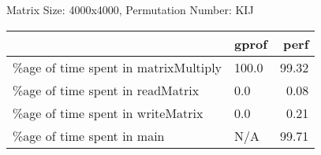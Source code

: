 \documentclass{article}
\begin{document}
    Matrix Size: 4000x4000, Permutation Number: KIJ \\
    \begin{tabular}{llr}
\hline
                                      & gprof   &   perf \\
\hline
 \%age of time spent in matrixMultiply & 100.0   &  99.32 \\
 \%age of time spent in readMatrix     & 0.0     &   0.08 \\
 \%age of time spent in writeMatrix    & 0.0     &   0.21 \\
 \%age of time spent in main           & N/A     &  99.71 \\
\hline
\end{tabular}
    
\end{document}
